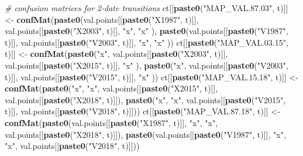 \documentclass[a4paper, notitlepage, 12pt, krantz2]{krantz}
\newenvironment{Shaded}{\begin{snugshade}}{\end{snugshade}}
\newcommand{\CommentTok}[1]{\textcolor[rgb]{0.56,0.35,0.01}{\textit{#1}}}
\newcommand{\KeywordTok}[1]{\textcolor[rgb]{0.13,0.29,0.53}{\textbf{#1}}}
\newcommand{\NormalTok}[1]{#1}
\newcommand{\StringTok}[1]{\textcolor[rgb]{0.31,0.60,0.02}{#1}}
\begin{document}
\begin{Shaded}
\begin{Highlighting}[]
{{{{{{{{{  \CommentTok{# confusion matrices for 2-date transitions}
\NormalTok{  ct[[}\KeywordTok{paste0}\NormalTok{(}\StringTok{"MAP_VAL.87.03"}\NormalTok{, t)]]       <-}\StringTok{ }\KeywordTok{confMat}\NormalTok{(}\KeywordTok{paste0}\NormalTok{(val.points[[}\KeywordTok{paste0}\NormalTok{(}\StringTok{"X1987"}\NormalTok{, t)]], val.points[[}\KeywordTok{paste0}\NormalTok{(}\StringTok{"X2003"}\NormalTok{, t)]], }\StringTok{"x"}\NormalTok{,         }\StringTok{"x"}\NormalTok{        ), }\KeywordTok{paste0}\NormalTok{(val.points[[}\KeywordTok{paste0}\NormalTok{(}\StringTok{"V1987"}\NormalTok{, t)]], val.points[[}\KeywordTok{paste0}\NormalTok{(}\StringTok{"V2003"}\NormalTok{, t)]], }\StringTok{"x"}\NormalTok{,         }\StringTok{"x"}\NormalTok{        ))}
\NormalTok{  ct[[}\KeywordTok{paste0}\NormalTok{(}\StringTok{"MAP_VAL.03.15"}\NormalTok{, t)]]       <-}\StringTok{ }\KeywordTok{confMat}\NormalTok{(}\KeywordTok{paste0}\NormalTok{(}\StringTok{"x"}\NormalTok{,         val.points[[}\KeywordTok{paste0}\NormalTok{(}\StringTok{"X2003"}\NormalTok{, t)]], val.points[[}\KeywordTok{paste0}\NormalTok{(}\StringTok{"X2015"}\NormalTok{, t)]], }\StringTok{"x"}\NormalTok{        ), }\KeywordTok{paste0}\NormalTok{(}\StringTok{"x"}\NormalTok{,         val.points[[}\KeywordTok{paste0}\NormalTok{(}\StringTok{"V2003"}\NormalTok{, t)]], val.points[[}\KeywordTok{paste0}\NormalTok{(}\StringTok{"V2015"}\NormalTok{, t)]], }\StringTok{"x"}\NormalTok{        ))}
\NormalTok{  ct[[}\KeywordTok{paste0}\NormalTok{(}\StringTok{"MAP_VAL.15.18"}\NormalTok{, t)]]       <-}\StringTok{ }\KeywordTok{confMat}\NormalTok{(}\KeywordTok{paste0}\NormalTok{(}\StringTok{"x"}\NormalTok{,         }\StringTok{"x"}\NormalTok{,         val.points[[}\KeywordTok{paste0}\NormalTok{(}\StringTok{"X2015"}\NormalTok{, t)]], val.points[[}\KeywordTok{paste0}\NormalTok{(}\StringTok{"X2018"}\NormalTok{, t)]]), }\KeywordTok{paste0}\NormalTok{(}\StringTok{"x"}\NormalTok{,         }\StringTok{"x"}\NormalTok{,         val.points[[}\KeywordTok{paste0}\NormalTok{(}\StringTok{"V2015"}\NormalTok{, t)]], val.points[[}\KeywordTok{paste0}\NormalTok{(}\StringTok{"V2018"}\NormalTok{, t)]]))}
\NormalTok{  ct[[}\KeywordTok{paste0}\NormalTok{(}\StringTok{"MAP_VAL.87.18"}\NormalTok{, t)]]       <-}\StringTok{ }\KeywordTok{confMat}\NormalTok{(}\KeywordTok{paste0}\NormalTok{(val.points[[}\KeywordTok{paste0}\NormalTok{(}\StringTok{"X1987"}\NormalTok{, t)]], }\StringTok{"x"}\NormalTok{,         }\StringTok{"x"}\NormalTok{,         val.points[[}\KeywordTok{paste0}\NormalTok{(}\StringTok{"X2018"}\NormalTok{, t)]]), }\KeywordTok{paste0}\NormalTok{(val.points[[}\KeywordTok{paste0}\NormalTok{(}\StringTok{"V1987"}\NormalTok{, t)]], }\StringTok{"x"}\NormalTok{,         }\StringTok{"x"}\NormalTok{,         val.points[[}\KeywordTok{paste0}\NormalTok{(}\StringTok{"V2018"}\NormalTok{, t)]]))}
}}}}}}}}}
\end{Highlighting}
\end{Shaded}
\end{document}

